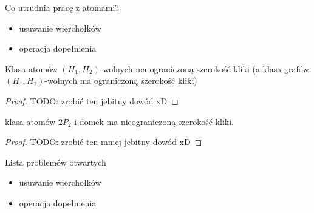 \documentclass[polish]{beamer}
\begin{document}
\begin{frame}{Co utrudnia pracę z atomami?}
    \begin{itemize}
        \item usuwanie wierchołków
        \item operacja dopełnienia
    \end{itemize}
\end{frame}

\begin{frame}
    \begin{theorem}
        Klasa atomów $(H_1, H_2)$-wolnych ma ograniczoną szerokość kliki (a klasa grafów $(H_1, H_2)$-wolnych ma ograniczoną szerokość kliki)
    \end{theorem}
    \begin{proof}
        \renewcommand{\qedsymbol}{}
        TODO: zrobić ten jebitny dowód xD
    \end{proof}
\end{frame}

\begin{frame}
    \begin{theorem}
        klasa atomów $2P_2$ i domek ma nieograniczoną szerokość kliki.
    \end{theorem}
    \begin{proof}
        \renewcommand{\qedsymbol}{}
        TODO: zrobić ten mniej jebitny dowód xD
    \end{proof}
\end{frame}

\begin{frame}{Lista problemów otwartych}
    \begin{itemize}
        \item usuwanie wierchołków
        \item operacja dopełnienia
    \end{itemize}
\end{frame}

\end{document}
